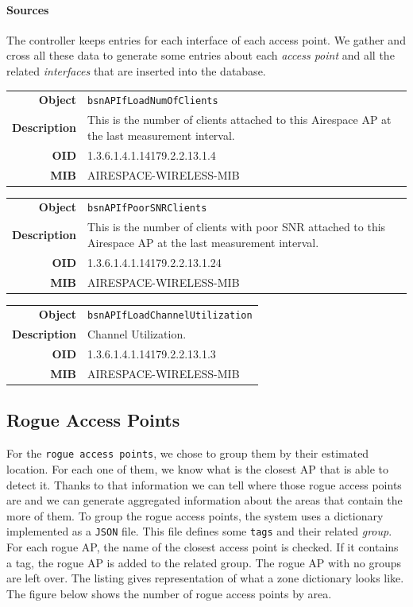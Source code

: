 \paragraph*{Sources} The controller keeps entries for each interface of each access point. We gather and cross all these data to generate some entries about each \emph{access point} and all the related \emph{interfaces} that are inserted into the database.

\begin{tabular}{|r l|}
\hline
\textbf{Object} & \texttt{bsnAPIfLoadNumOfClients} \\
\textbf{Description} & \parbox{11cm}{This is the number of clients attached to this Airespace AP at the last measurement interval.} \\
\textbf{OID} & 1.3.6.1.4.1.14179.2.2.13.1.4 \\
\textbf{MIB} & AIRESPACE-WIRELESS-MIB \\
\hline
\end{tabular}

\begin{tabular}{|r l|}
\hline
\textbf{Object} & \texttt{bsnAPIfPoorSNRClients} \\
\textbf{Description} & \parbox{11cm}{This is the number of clients with poor SNR attached to this Airespace AP at the last measurement interval.} \\
\textbf{OID} & 1.3.6.1.4.1.14179.2.2.13.1.24 \\
\textbf{MIB} & AIRESPACE-WIRELESS-MIB \\
\hline
\end{tabular}

\begin{tabular}{|r l|}
\hline
\textbf{Object} & \texttt{bsnAPIfLoadChannelUtilization} \\
\textbf{Description} & \parbox{11cm}{Channel Utilization.} \\
\textbf{OID} & 1.3.6.1.4.1.14179.2.2.13.1.3 \\
\textbf{MIB} & AIRESPACE-WIRELESS-MIB \\
\hline
\end{tabular}

\subsection{Rogue Access Points}
For the \texttt{rogue access points}, we chose to group them by their estimated location. For each one of them, we know what is the closest AP that is able to detect it. Thanks to that information we can tell where those rogue access points are and we can generate aggregated information about the areas that contain the more of them. To group the rogue access points, the system uses a dictionary implemented as a \texttt{JSON} file. This file defines some \texttt{tags} and their related \emph{group}. For each rogue AP, the name of the closest access point is checked. If it contains a tag, the rogue AP is added to the related group. The rogue AP with no groups are left over. The listing gives representation of what a zone dictionary looks like. The figure below shows the number of rogue access points by area.

